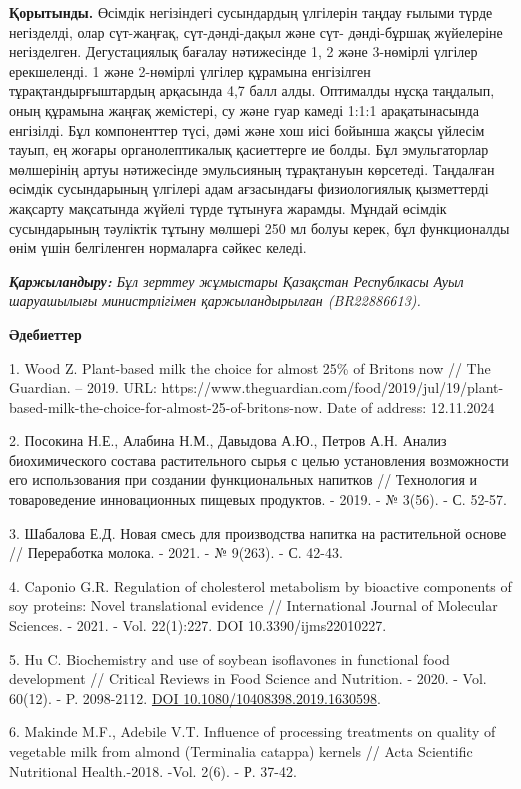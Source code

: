 {{\bfseries Қорытынды.} Өсімдік негізіндегі сусындардың үлгілерін таңдау
ғылыми түрде негізделді, олар сүт-жаңғақ, сүт-дәнді-дақыл және сүт-
дәнді-бұршақ жүйелеріне негізделген. Дегустациялық бағалау нәтижесінде
1, 2 және 3-нөмірлі үлгілер ерекшеленді. 1 және 2-нөмірлі үлгілер
құрамына енгізілген тұрақтандырғыштардың арқасында 4,7 балл алды.
Оптималды нұсқа таңдалып, оның құрамына жаңғақ жемістері, су және гуар
камеді 1:1:1 арақатынасында енгізілді. Бұл компоненттер түсі, дәмі және
хош иісі бойынша жақсы үйлесім тауып, ең жоғары органолептикалық
қасиеттерге ие болды. Бұл эмульгаторлар мөлшерінің артуы нәтижесінде
эмульсияның тұрақтануын көрсетеді. Таңдалған өсімдік сусындарының
үлгілері адам ағзасындағы физиологиялық қызметтерді жақсарту мақсатында
жүйелі түрде тұтынуға жарамды. Мұндай өсімдік сусындарының тәуліктік
тұтыну мөлшері 250 мл болуы керек, бұл функционалды өнім үшін
белгіленген нормаларға сәйкес келеді.~

\emph{{\bfseries Қаржыландыру:} Бұл зерттеу жұмыстары Қазақстан Республкасы
Ауыл шаруашылығы министрлігімен қаржыландырылған (BR22886613).}

{\bfseries Әдебиеттер}

1. Wood Z. Plant-based milk the choice for almost 25\% of Britons now //
The Guardian. -- 2019. URL:
https://www.theguardian.com/food/2019/jul/19/plant-based-milk-the-choice-for-almost-25-of-britons-now.
Date of address: 12.11.2024

2. Посокина Н.Е., Алабина Н.М., Давыдова А.Ю., Петров А.Н. Анализ
биохимического состава растительного сырья с целью установления
возможности его использования при создании функциональных напитков //
Технология и товароведение инновационных пищевых продуктов. - 2019. - №
3(56). - С. 52-57.

3. Шабалова Е.Д. Новая смесь для производства напитка на растительной
основе // Переработка молока. - 2021. - № 9(263). - С. 42-43.

4. Caponio G.R. Regulation of cholesterol metabolism by bioactive
components of soy proteins: Novel translational evidence //
International Journal of Molecular Sciences. - 2021. - Vol. 22(1):227.
DOI 10.3390/ijms22010227.

5. Hu C. Biochemistry and use of soybean isoflavones in functional food
development // Critical Reviews in Food Science and Nutrition. - 2020. -
Vol. 60(12). - P. 2098-2112.
\href{https://doi.org/10.1080/10408398.2019.1630598}{DOI
10.1080/10408398.2019.1630598}.

6. Makinde M.F., Adebile V.T. Influence of processing treatments on
quality of vegetable milk from almond (Terminalia catappa) kernels //
Acta Scientific Nutritional Health.-2018. -Vol. 2(6). - Р. 37-42.

}
